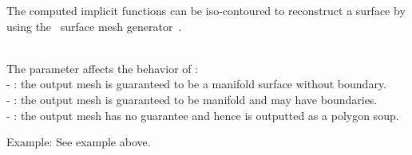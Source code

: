 The computed implicit functions can be iso-contoured to reconstruct a surface by using the \cgal\ surface mesh generator~\cite{cgal:ry-gsddrm-06,cgal:bo-pgsms-05}.

  \\

The parameter  affects the behavior of : \\
- : the output mesh is guaranteed to be a manifold surface without boundary.\\
- : the output mesh is guaranteed to be manifold and may have boundaries.\\
- : the output mesh has no guarantee and hence is outputted as a polygon soup.

Example:
See  example above.
